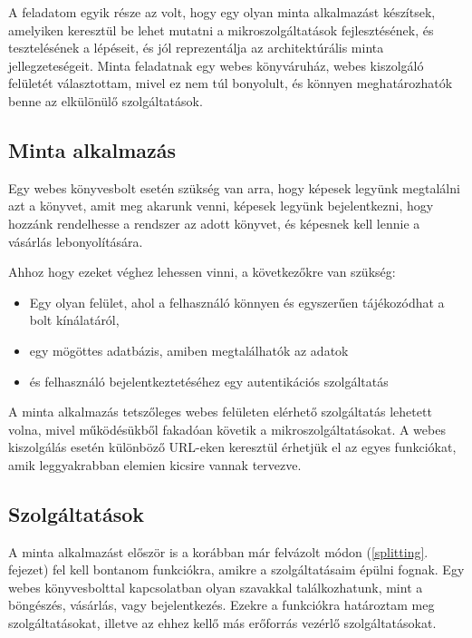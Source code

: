 \documentclass[11pt,magyar,a4paper,twoside,]{report}
\providecommand{\tightlist}{%
  \setlength{\itemsep}{0pt}\setlength{\parskip}{0pt}}
\begin{document}
A feladatom egyik része az volt, hogy egy olyan minta alkalmazást
készítsek, amelyiken keresztül be lehet mutatni a mikroszolgáltatások
fejlesztésének, és tesztelésének a lépéseit, és jól reprezentálja az
architektúrális minta jellegzeteségeit. Minta feladatnak egy webes
könyváruház, webes kiszolgáló felületét választottam, mivel ez nem túl
bonyolult, és könnyen meghatározhatók benne az elkülönülő
szolgáltatások.

\subsection{Minta alkalmazás}\label{minta-alkalmazuxe1s}

Egy webes könyvesbolt esetén szükség van arra, hogy képesek legyünk
megtalálni azt a könyvet, amit meg akarunk venni, képesek legyünk
bejelentkezni, hogy hozzánk rendelhesse a rendszer az adott könyvet, és
képesnek kell lennie a vásárlás lebonyolítására.

Ahhoz hogy ezeket véghez lehessen vinni, a következőkre van szükség:

\begin{itemize}
\tightlist
\item
  Egy olyan felület, ahol a felhasználó könnyen és egyszerűen
  tájékozódhat a bolt kínálatáról,
\item
  egy mögöttes adatbázis, amiben megtalálhatók az adatok
\item
  és felhasználó bejelentkeztetéséhez egy autentikációs szolgáltatás
\end{itemize}

A minta alkalmazás tetszőleges webes felületen elérhető szolgáltatás
lehetett volna, mivel működésükből fakadóan követik a
mikroszolgáltatásokat. A webes kiszolgálás esetén különböző URL-eken
keresztül érhetjük el az egyes funkciókat, amik leggyakrabban elemien
kicsire vannak tervezve.

\subsection{Szolgáltatások}\label{szolguxe1ltatuxe1sok}

A minta alkalmazást először is a korábban már felvázolt módon
(\ref{splitting}. fejezet) fel kell bontanom funkciókra, amikre a
szolgáltatásaim épülni fognak. Egy webes könyvesbolttal kapcsolatban
olyan szavakkal találkozhatunk, mint a böngészés, vásárlás, vagy
bejelentkezés. Ezekre a funkciókra határoztam meg szolgáltatásokat,
illetve az ehhez kellő más erőforrás vezérlő szolgáltatásokat.
\end{document}

